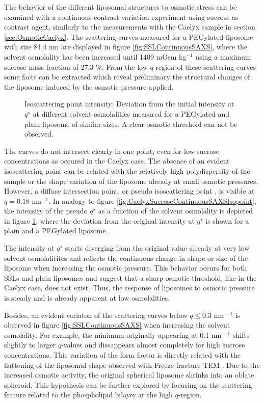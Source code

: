 The behavior of the different liposomal structures to osmotic stress can be examined with a continuous contrast variation experiment using sucrose as contrast agent, similarly to the measurements with the Caelyx sample in section \ref{sec:OsmoticCaelyx}. The scattering curves measured for a PEGylated liposome with size 81.4 nm are displayed in figure \ref{fig:SSLContinuousSAXS}, where the solvent osmolality has been increased until 1409 mOsm kg$^{-1}$ using a maximum sucrose mass fraction of 27.3 $\%$. From the low $q$-region of these scattering curves some facts can be extracted which reveal preliminary the structural changes of the liposome induced by the osmotic pressure applied.

\begin{figure}
	\centering
		
		\caption{Isoscattering point intensity: Deviation from the initial intensity at $q^{\star}$ at different solvent osmolalities measured for a PEGylated and plain liposome of similar sizes. A clear osmotic threshold can not be observed.}
		\label{fig:SSLIsopointIntensity}
\end{figure}

The curves do not intersect clearly in one point, even for low sucrose concentrations as occured in the Caelyx case. The absence of an evident isoscattering point can be related with the relatively high polydispersity of the sample or the shape variation of the liposome already at small osmotic pressures. However, a diffuse intersection point, or pseudo isoscattering point \cite{kawaguchi_application_2004}, is visible at $q=0.18$ nm$^{-1}$. In analogy to figure \ref{fig:CaelyxSucroseContinuousSAXSIsopoint}, the intensity of the pseudo $q^{\star}$ as a function of the solvent osmolality is depicted in figure \ref{fig:SSLIsopointIntensity}, where the deviation from the original intensity at $q^{\star}$ is shown for a plain and a PEGylated liposome.

The intensity at $q^{\star}$ starts diverging from the original value already at very low solvent osmolalitites and reflects the continuous change in shape or size of the liposome when increasing the osmotic pressure. This behavior occurs for both SSLs and plain liposomes and suggest that a sharp osmotic threshold, like in the Caelyx case, does not exist. Thus, the response of liposomes to osmotic pressure is steady and is already apparent at low osmolalities.

Besides, an evident variaton of the scattering curves below $q\leq0.3$ nm $^{-1}$ is observed in figure \ref{fig:SSLContinuousSAXS} when increasing the solvent osmolality. For example, the minimum originally appearing at 0.1 nm $^{-1}$ shifts slightly to larger $q$-values and dissappears almost completely for high sucrose concentrations. This variation of the form factor is directly related with the flattening of the liposomal shape observed with Freeze-fracture TEM \cite{varga_osmotic_2014}. Due to the increased osmotic activity, the original spherical liposome shrinks into an oblate spheroid. This hypothesis can be further explored by focusing on the scattering feature related to the phospholipid bilayer at the high $q$-region.

